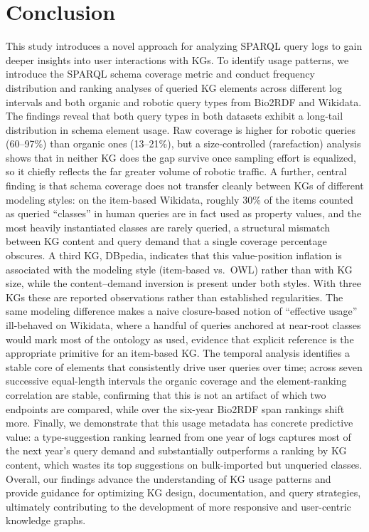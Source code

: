 \documentclass[sw]{iosart2x}
\begin{document}
\section{Conclusion}\label{s6}
This study introduces a novel approach for analyzing SPARQL query logs to gain deeper insights into user interactions with KGs. To identify usage patterns, we introduce the SPARQL schema coverage metric and conduct frequency distribution and ranking analyses of queried KG elements across different log intervals and both organic and robotic query types from Bio2RDF and Wikidata.
The findings reveal that both query types in both datasets exhibit a long-tail distribution in schema element usage. Raw coverage is higher for robotic queries (60--97\%) than organic ones (13--21\%), but a size-controlled (rarefaction) analysis shows that in neither KG does the gap survive once sampling effort is equalized, so it chiefly reflects the far greater volume of robotic traffic. A further, central finding is that schema coverage does not transfer cleanly between KGs of different modeling styles: on the item-based Wikidata, roughly 30\% of the items counted as queried ``classes'' in human queries are in fact used as property values, and the most heavily instantiated classes are rarely queried, a structural mismatch between KG content and query demand that a single coverage percentage obscures. A third KG, DBpedia, indicates that this value-position inflation is associated with the modeling style (item-based vs.\ OWL) rather than with KG size, while the content--demand inversion is present under both styles. With three KGs these are reported observations rather than established regularities. The same modeling difference makes a naive closure-based notion of ``effective usage'' ill-behaved on Wikidata, where a handful of queries anchored at near-root classes would mark most of the ontology as used, evidence that explicit reference is the appropriate primitive for an item-based KG.
The temporal analysis identifies a stable core of elements that consistently drive user queries over time; across seven successive equal-length intervals the organic coverage and the element-ranking correlation are stable, confirming that this is not an artifact of which two endpoints are compared, while over the six-year Bio2RDF span rankings shift more. Finally, we demonstrate that this usage metadata has concrete predictive value: a type-suggestion ranking learned from one year of logs captures most of the next year's query demand and substantially outperforms a ranking by KG content, which wastes its top suggestions on bulk-imported but unqueried classes.
Overall, our findings advance the understanding of KG usage patterns and provide guidance for optimizing KG design, documentation, and query strategies, ultimately contributing to the development of more responsive and user-centric knowledge graphs.
\end{document}
